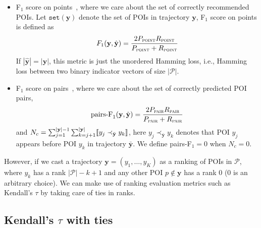 \begin{itemize}
  \item F$_1$ score on points~\cite{ijcai15}, where we care about the set of correctly recommended POIs.
      Let $\texttt{set}(\mathbf{y})$ denote the set of POIs in trajectory $\mathbf{y}$, F$_1$ score on points is defined as
\begin{equation*}
F_1(\mathbf{y}, \hat{\mathbf{y}}) = \frac{2  P_{\textsc{point}}  R_{\textsc{point}}}{P_{\textsc{point}} + R_{\textsc{point}}}
\end{equation*}
If $| \hat{\mathbf{y}} | = | \mathbf{y} |$, this metric is just the unordered Hamming loss,
i.e., Hamming loss between two binary indicator vectors of size $| \mathcal{P} |$.

\item F$_1$ score on pairs~\cite{cikm16paper}, where we care about the set of correctly predicted POI pairs,
\begin{equation*}
\text{pairs-F}_1(\mathbf{y}, \hat{\mathbf{y}}) = \frac{2 P_{\textsc{pair}} R_{\textsc{pair}}}{P_{\textsc{pair}} + R_{\textsc{pair}}}
\end{equation*}
and $N_c = \sum_{j=1}^{| \mathbf{y} | - 1} \sum_{k=j+1}^{| \mathbf{y} |} \llbracket y_j \prec_{\bar{\mathbf{y}}} y_k \rrbracket$,
here $y_j \prec_{\bar{\mathbf{y}}} y_k$ denotes that POI $y_j$ appears before POI $y_k$ in trajectory $\bar{\mathbf{y}}$.
We define pairs-F$_1 = 0$ when $N_c = 0$.

\end{itemize}

However, if we cast a trajectory $\mathbf{y} = (y_1,\dots,y_K)$ as a ranking of POIs in $\mathcal{P}$,
where $y_k$ has a rank $| \mathcal{P} | - k + 1$ and any other POI $p \notin \mathbf{y}$ has a rank $0$ ($0$ is an arbitrary choice).
We can make use of ranking evaluation metrics such as Kendall's $\tau$ by taking care of ties in ranks.

\subsection{Kendall's $\tau$ with ties}

